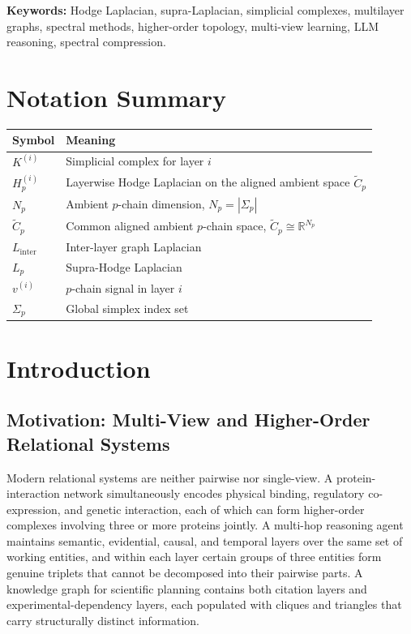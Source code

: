 \documentclass[11pt]{article}
\theoremstyle{definition}
\theoremstyle{remark}
\newcommand{\R}{\mathbb{R}}
\newcommand{\Ctil}{\widetilde{C}}
\begin{document}
\noindent\textbf{Keywords:} Hodge Laplacian, supra-Laplacian, simplicial complexes,
multilayer graphs, spectral methods, higher-order topology, multi-view learning,
LLM reasoning, spectral compression.

\clearpage
\tableofcontents
\clearpage

\section*{Notation Summary}

\begin{center}
\begin{tabular}{ll}
\toprule
Symbol & Meaning \\
\midrule
$K^{(i)}$ & Simplicial complex for layer $i$ \\
$H_p^{(i)}$ & Layerwise Hodge Laplacian on the aligned ambient space $\Ctil_p$ \\
$N_p$ & Ambient $p$-chain dimension, $N_p=|\Sigma_p|$ \\
$\Ctil_p$ & Common aligned ambient $p$-chain space, $\Ctil_p\cong\R^{N_p}$ \\
$L_{\mathrm{inter}}$ & Inter-layer graph Laplacian \\
$L_p$ & Supra-Hodge Laplacian \\
$v^{(i)}$ & $p$-chain signal in layer $i$ \\
$\Sigma_p$ & Global simplex index set \\
\bottomrule
\end{tabular}
\end{center}

\clearpage
\section{Introduction}
\label{sec:intro}

\subsection{Motivation: Multi-View and Higher-Order Relational Systems}
\label{subsec:motivation}

Modern relational systems are neither pairwise nor single-view. A
protein-interaction network simultaneously encodes physical binding, regulatory
co-expression, and genetic interaction, each of which can form higher-order
complexes involving three or more proteins jointly. A multi-hop reasoning agent
maintains semantic, evidential, causal, and temporal layers over the same set
of working entities, and within each layer certain groups of three entities form
genuine triplets that cannot be decomposed into their pairwise parts. A
knowledge graph for scientific planning contains both citation layers and
experimental-dependency layers, each populated with cliques and triangles that
carry structurally distinct information.
\end{document}
